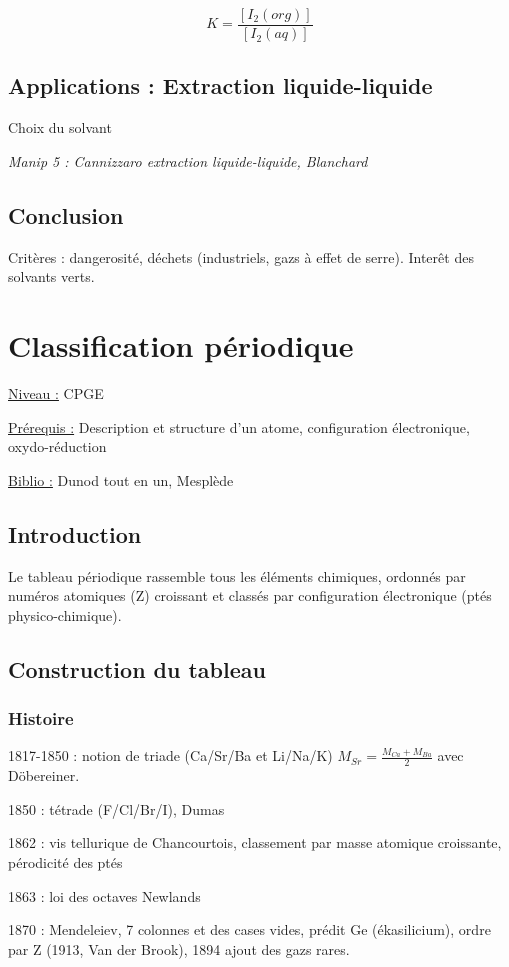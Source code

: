 \documentclass{article}%
\begin{document}
\[K=\frac{[I_2(org)]}{[I_2(aq)]}\]
\subsection{Applications : Extraction liquide-liquide}
Choix du solvant

\textit{Manip 5 : Cannizzaro extraction liquide-liquide, Blanchard}

\subsection{Conclusion}

Critères : dangerosité, déchets (industriels, gazs à effet de serre). Interêt des solvants verts.
\section{Classification périodique}
\underline{Niveau :} CPGE 

\underline{Prérequis :} Description et structure d'un atome, configuration électronique, oxydo-réduction

\underline{Biblio :} Dunod tout en un, Mesplède

\subsection{Introduction}

Le tableau périodique rassemble tous les éléments chimiques, ordonnés par numéros atomiques (Z) croissant et classés par configuration électronique (ptés physico-chimique).

\subsection{Construction du tableau}
\subsubsection{Histoire}
1817-1850 : notion de triade (Ca/Sr/Ba et Li/Na/K) $M_{Sr}=\frac{M_{Ca}+M_{Ba}}{2}$ avec Döbereiner.

1850 : tétrade (F/Cl/Br/I), Dumas

1862 : vis tellurique de Chancourtois, classement par masse atomique croissante, pérodicité des ptés

1863 : loi des octaves Newlands

1870 : Mendeleiev, 7 colonnes et des cases vides, prédit Ge (ékasilicium), ordre par Z (1913, Van der Brook), 1894 ajout des gazs rares.
\end{document}
